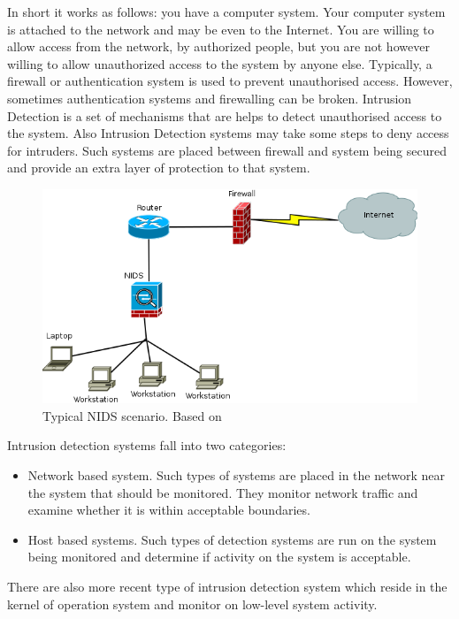 \documentclass[thesis=M,english]{FITthesis}[2011/07/15]
\begin{document}
In short it works as follows: you have a computer system. Your computer system is attached to the network and may be even to the Internet. You are willing to allow access from the network, by authorized people, but you are not however willing to allow unauthorized access to the system by anyone else. Typically, a firewall or authentication system is used to prevent unauthorised access. However, sometimes authentication systems and firewalling can be broken. Intrusion Detection is a set of mechanisms that are helps to detect unauthorised access to the system. Also Intrusion Detection systems may take some steps to deny access for intruders. Such systems are placed between firewall and system being secured and provide an extra layer of protection to that system.
\begin{figure}[h]
\centering
\includegraphics[scale=0.5]{images/Typical_NIDS.png}
\caption{Typical NIDS scenario. Based on \cite{iatac_tools_report}}
\label{fig:typical_nids}
\end{figure}
Intrusion detection systems fall into two categories:
\begin{itemize}
\item Network based system. 
Such types of systems are placed in the network near the system that should be monitored. They monitor network traffic and examine whether it is within acceptable boundaries.
\item Host based systems. 
Such types of detection systems are run on the system being monitored and determine if activity on the system is acceptable.
\end{itemize}
There are also more recent type of intrusion detection system which reside in the kernel of operation system and monitor on low-level system activity.
\end{document}

